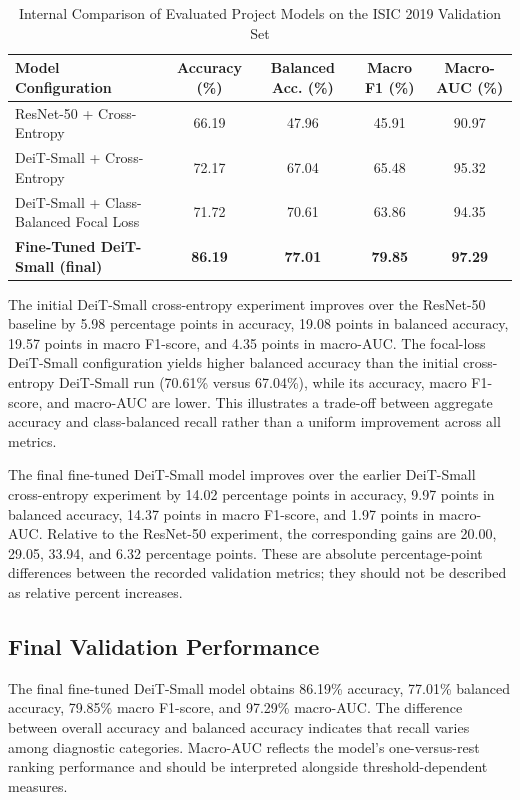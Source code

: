 \documentclass[conference]{IEEEtran}
\begin{document}
\begin{table}[!t]
\caption{Internal Comparison of Evaluated Project Models on the ISIC 2019 Validation Set}
\label{tab:models}
\centering
\footnotesize
\begin{tabular}{lcccc}
\toprule
\textbf{Model Configuration} & \textbf{Accuracy (\%)} & \textbf{Balanced Acc. (\%)} & \textbf{Macro F1 (\%)} & \textbf{Macro-AUC (\%)}\\
\midrule
ResNet-50 + Cross-Entropy & 66.19 & 47.96 & 45.91 & 90.97\\
DeiT-Small + Cross-Entropy & 72.17 & 67.04 & 65.48 & 95.32\\
DeiT-Small + Class-Balanced Focal Loss & 71.72 & 70.61 & 63.86 & 94.35\\
\textbf{Fine-Tuned DeiT-Small (final)} & \textbf{86.19} & \textbf{77.01} & \textbf{79.85} & \textbf{97.29}\\
\bottomrule
\end{tabular}
\end{table}

The initial DeiT-Small cross-entropy experiment improves over the ResNet-50 baseline by 5.98 percentage points in accuracy, 19.08 points in balanced accuracy, 19.57 points in macro F1-score, and 4.35 points in macro-AUC. The focal-loss DeiT-Small configuration yields higher balanced accuracy than the initial cross-entropy DeiT-Small run (70.61\% versus 67.04\%), while its accuracy, macro F1-score, and macro-AUC are lower. This illustrates a trade-off between aggregate accuracy and class-balanced recall rather than a uniform improvement across all metrics.

The final fine-tuned DeiT-Small model improves over the earlier DeiT-Small cross-entropy experiment by 14.02 percentage points in accuracy, 9.97 points in balanced accuracy, 14.37 points in macro F1-score, and 1.97 points in macro-AUC. Relative to the ResNet-50 experiment, the corresponding gains are 20.00, 29.05, 33.94, and 6.32 percentage points. These are absolute percentage-point differences between the recorded validation metrics; they should not be described as relative percent increases.

\subsection{Final Validation Performance}
The final fine-tuned DeiT-Small model obtains 86.19\% accuracy, 77.01\% balanced accuracy, 79.85\% macro F1-score, and 97.29\% macro-AUC. The difference between overall accuracy and balanced accuracy indicates that recall varies among diagnostic categories. Macro-AUC reflects the model's one-versus-rest ranking performance and should be interpreted alongside threshold-dependent measures.
\end{document}
